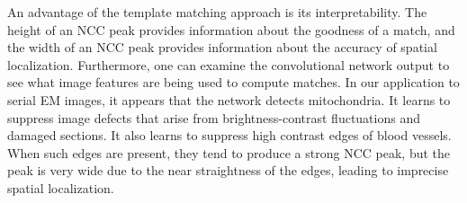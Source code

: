 \documentclass{article}
\begin{document}
An advantage of the template matching approach is its interpretability. The height of an NCC peak provides information about the goodness of a match, and the width of an NCC peak provides information about the accuracy of spatial localization. Furthermore, one can examine the convolutional network output to see what image features are being used to compute matches. In our application to serial EM images, it appears that the network detects mitochondria. It learns to suppress image defects that arise from brightness-contrast fluctuations and damaged sections. It also learns to suppress high contrast edges of blood vessels. When such edges are present, they tend to produce a strong NCC peak, but the peak is very wide due to the near straightness of the edges, leading to imprecise spatial localization.




\end{document}
